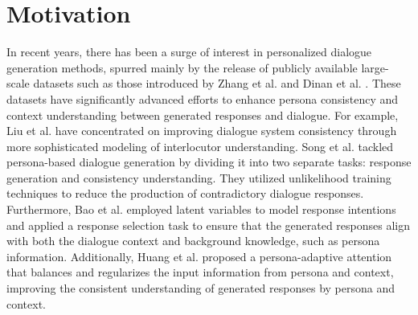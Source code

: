 
\section{Motivation}
In recent years, there has been a surge of interest in personalized dialogue generation methods, spurred mainly by the release of publicly available large-scale datasets such as those introduced by Zhang et al. \cite{zhang-etal-2018-personalizing} and Dinan et al. \cite{dinan-etal-2019-convai2}. These datasets have significantly advanced efforts to enhance persona consistency and context understanding between generated responses and dialogue. For example, Liu et al. \cite{liu-etal-2020-impress} have concentrated on improving dialogue system consistency through more sophisticated modeling of interlocutor understanding. Song et al. \cite{song-etal-2021-bob} tackled persona-based dialogue generation by dividing it into two separate tasks: response generation and consistency understanding. They utilized unlikelihood training techniques to reduce the production of contradictory dialogue responses. Furthermore, Bao et al. \cite{bao-etal-2020-plato} \cite{bao-etal-2021-plato} employed latent variables to model response intentions and applied a response selection task to ensure that the generated responses align with both the dialogue context and background knowledge, such as persona information. Additionally, Huang et al. \cite{huang-etal-2023-paa} proposed a persona-adaptive attention that balances and regularizes the input information from persona and context, improving the consistent understanding of generated responses by persona and context.

